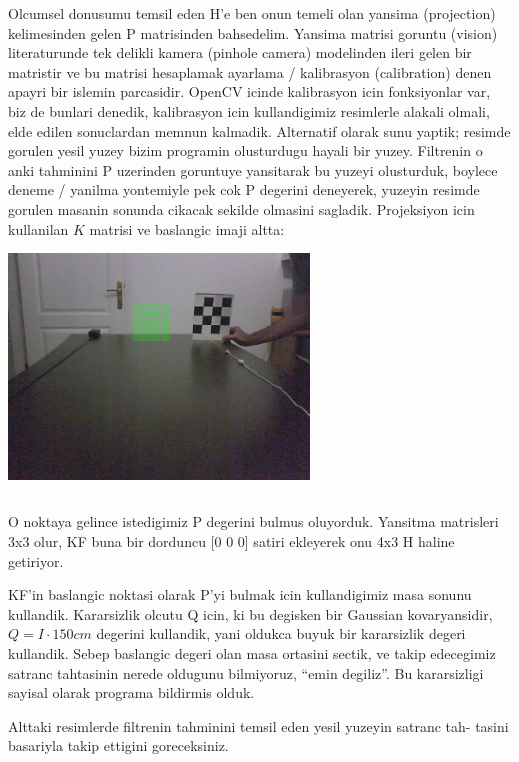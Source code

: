 \documentclass[12pt,fleqn]{article}\usepackage{../common}
\begin{document}
Olcumsel donusumu temsil eden H'e ben onun temeli olan yansima (projection)
kelimesinden gelen P matrisinden bahsedelim. Yansima matrisi goruntu
(vision) literaturunde tek delikli kamera (pinhole camera) modelinden ileri
gelen bir matristir ve bu matrisi hesaplamak ayarlama / kalibrasyon
(calibration) denen apayri bir islemin parcasidir. OpenCV icinde
kalibrasyon icin fonksiyonlar var, biz de bunlari denedik, kalibrasyon icin
kullandigimiz resimlerle alakali olmali, elde edilen sonuclardan memnun
kalmadik. Alternatif olarak sunu yaptik; resimde gorulen yesil yuzey bizim
programin olusturdugu hayali bir yuzey. Filtrenin o anki tahminini P
uzerinden goruntuye yansitarak bu yuzeyi olusturduk, boylece deneme /
yanilma yontemiyle pek cok P degerini deneyerek, yuzeyin resimde gorulen
masanin sonunda cikacak sekilde olmasini sagladik. Projeksiyon icin
kullanilan $K$ matrisi ve baslangic imaji altta:

\includegraphics[height=6cm]{first-projection.jpg}

\inputminted{python}{K.py}

O noktaya gelince istedigimiz P degerini bulmus oluyorduk. Yansitma
matrisleri 3x3 olur, KF buna bir dorduncu [0 0 0] satiri ekleyerek onu 4x3
H haline getiriyor.

KF'in baslangic noktasi olarak P'yi bulmak icin kullandigimiz masa sonunu
kullandik. Kararsizlik olcutu Q icin, ki bu degisken bir Gaussian
kovaryansidir, $Q = I \cdot 150 cm$ degerini kullandik, yani oldukca buyuk bir
kararsizlik degeri kullandik. Sebep baslangic degeri olan masa ortasini
sectik, ve takip edecegimiz satranc tahtasinin nerede oldugunu bilmiyoruz,
``emin degiliz''.  Bu kararsizligi sayisal olarak programa bildirmis olduk.

Alttaki resimlerde filtrenin tahminini temsil eden yesil yuzeyin satranc tah-
tasini basariyla takip ettigini goreceksiniz.

\inputminted{python}{track-chess-kf.py}
\end{document}
